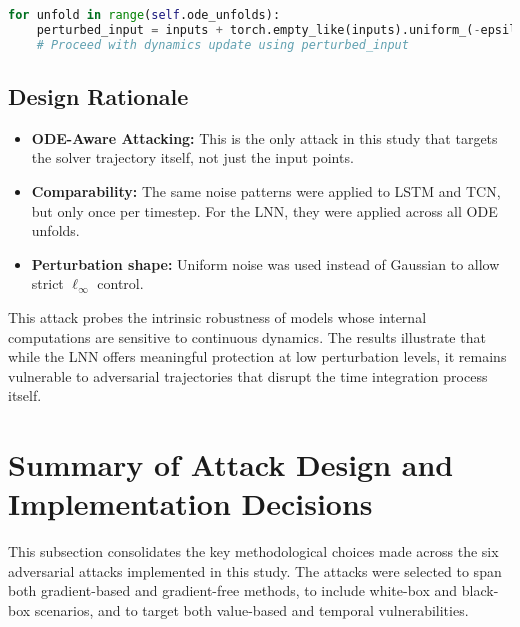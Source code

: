 \begin{lstlisting}[language=Python, caption={Continuous-Time Perturbation Injection}]
for unfold in range(self.ode_unfolds):
    perturbed_input = inputs + torch.empty_like(inputs).uniform_(-epsilon, epsilon)
    # Proceed with dynamics update using perturbed_input
\end{lstlisting}

\subsection*{Design Rationale}
\begin{itemize}
    \item \textbf{ODE-Aware Attacking:} This is the only attack in this study that targets the solver trajectory itself, not just the input points.
    \item \textbf{Comparability:} The same noise patterns were applied to LSTM and TCN, but only once per timestep. For the LNN, they were applied across all ODE unfolds.
    \item \textbf{Perturbation shape:} Uniform noise was used instead of Gaussian to allow strict $\ell_\infty$ control.
\end{itemize}

This attack probes the intrinsic robustness of models whose internal computations are sensitive to continuous dynamics. The results illustrate that while the LNN offers meaningful protection at low perturbation levels, it remains vulnerable to adversarial trajectories that disrupt the time integration process itself.

\section{Summary of Attack Design and Implementation Decisions}

This subsection consolidates the key methodological choices made across the six adversarial attacks implemented in this study. The attacks were selected to span both gradient-based and gradient-free methods, to include white-box and black-box scenarios, and to target both value-based and temporal vulnerabilities.

